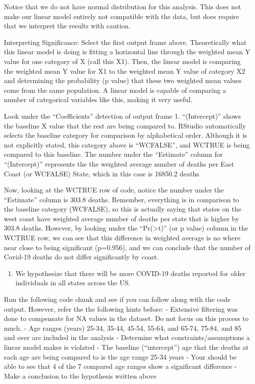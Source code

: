 \documentclass[
]{article}
\providecommand{\tightlist}{%
  \setlength{\itemsep}{0pt}\setlength{\parskip}{0pt}}
\begin{document}
Notice that we do not have normal distribution for this analysis. This
does not make our linear model entirely not compatible with the data,
but does require that we interpret the results with caution.

Interpreting Significance: Select the first output frame above.
Theoretically what this linear model is doing is fitting a horizontal
line through the weighted mean Y value for one category of X (call this
X1). Then, the linear model is comparing the weighted mean Y value for
X1 to the weighted mean Y value of category X2 and determining the
probability (p value) that these two weighted mean values come from the
same population. A linear model is capable of comparing a number of
categorical variables like this, making it very useful.

Look under the ``Coefficients'' detection of output frame 1.
``(Intercept)'' shows the baseline X value that the rest are being
compared to. RStudio automatically selects the baseline category for
comparison by alphabetical order. Although it is not explicitly stated,
this category above is ``WCFALSE'', and WCTRUE is being compared to this
baseline. The number under the ``Estimate'' column for ``(Intercept)''
represents the the weighted average number of deaths per East Coast (or
WCFALSE) State, which in this case is 16850.2 deaths.

Now, looking at the WCTRUE row of code, notice the number under the
``Estimate'' column is 303.8 deaths. Remember, everything is in
comparison to the baseline category (WCFALSE), so this is actually
saying that states on the west coast have weighted average number of
deaths per state that is higher by 303.8 deaths. However, by looking
under the ``Pr(\textgreater\textbar t\textbar)'' (or p value) column in
the WCTRUE row, we can see that this difference in weighted average is
no where near close to being significant (p=0.956), and we can conclude
that the number of Covid-19 deaths do not differ significantly by coast.

\begin{enumerate}
\def\labelenumi{\arabic{enumi}.}
\setcounter{enumi}{1}
\tightlist
\item
  We hypothesize that there will be more COVID-19 deaths reported for
  older individuals in all states across the US.
\end{enumerate}

Run the following code chunk and see if you can follow along with the
code output. However, refer the the following hints before: - Extensive
filtering was done to compensate for NA values in the dataset. Do not
focus on this process to much. - Age ranges (years) 25-34, 35-44, 45-54,
55-64, and 65-74, 75-84, and 85 and over are included in the analysis -
Determine what constraints/assumptions a linear model makes is violated
- The baseline (``intercept'') age that the deaths at each age are being
compared to is the age range 25-34 years - Your should be able to see
that 4 of the 7 compared age ranges show a significant difference - Make
a conclusion to the hypothesis written above
\end{document}
